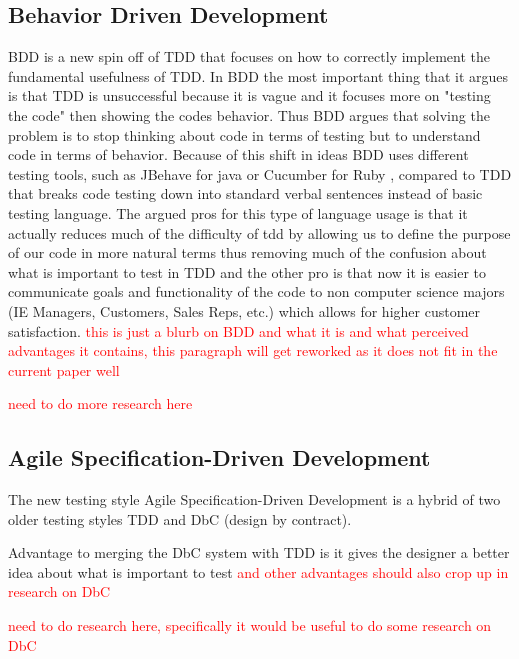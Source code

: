 \documentclass{sig-alternate}
\newcommand{\mycomment}[1]{\textcolor{red}{#1}}
\begin{document}
\subsection{Behavior Driven Development}
BDD is a new spin off of TDD that focuses on how to correctly implement the fundamental usefulness of TDD.  In BDD the most important thing that it argues is that TDD is unsuccessful because it is vague and it focuses more on "testing the code" then showing the codes behavior.  Thus BDD argues that solving the problem is to stop thinking about code in terms of testing but to understand code in terms of behavior.  Because of this shift in ideas BDD uses different testing tools, such as JBehave for java or Cucumber for Ruby \cite{Soeken:2012}, compared to TDD that breaks code testing down into standard verbal sentences instead of basic testing language.  The argued pros for this type of language usage is that it actually reduces much of the difficulty of tdd by allowing us to define the purpose of our code in more natural terms thus removing much of the confusion about what is important to test in TDD and the other pro is that now it is easier to communicate goals and functionality of the code to non computer science majors (IE Managers, Customers, Sales Reps, etc.) which allows for higher customer satisfaction.
\mycomment{this is just a blurb on BDD and what it is and what perceived advantages it contains, this paragraph will get reworked as it does not fit in the current paper well}

\mycomment{need to do more research here}

\subsection{Agile Specification-Driven Development}
The new testing style Agile Specification-Driven Development is a hybrid of two older testing styles TDD and DbC (design by contract).

Advantage to merging the DbC system with TDD is it gives the designer a better idea about what is important to test \mycomment{and other advantages should also crop up in research on DbC}

\mycomment{need to do research here, specifically it would be useful to do some research on DbC}
\end{document}
